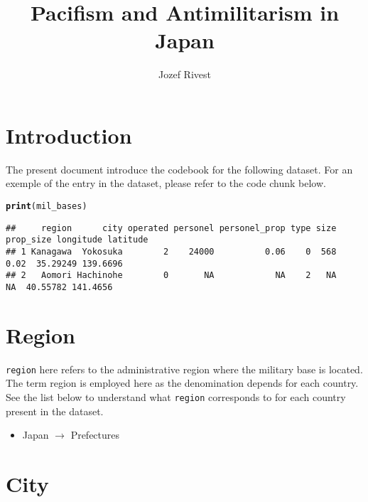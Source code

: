 \documentclass{article}\usepackage[]{graphicx}\usepackage[dvipsnames]{xcolor}
\title{Pacifism and Antimilitarism in Japan}
\author{Jozef Rivest}
\date{ }
\makeatletter
\newcommand{\hldef}[1]{\textcolor[rgb]{0.345,0.345,0.345}{#1}}%
\newcommand{\hlkwd}[1]{\textcolor[rgb]{0.737,0.353,0.396}{\textbf{#1}}}%
\newenvironment{kframe}{%
 \def\at@end@of@kframe{}%
 \ifinner\ifhmode%
  \def\at@end@of@kframe{\end{minipage}}%
  \begin{minipage}{\columnwidth}%
 \fi\fi%
 \def\FrameCommand##1{\hskip\@totalleftmargin \hskip-\fboxsep
 \colorbox{shadecolor}{##1}\hskip-\fboxsep
     \hskip-\linewidth \hskip-\@totalleftmargin \hskip\columnwidth}%
 \MakeFramed {\advance\hsize-\width
   \@totalleftmargin\z@ \linewidth\hsize
   \@setminipage}}%
 {\par\unskip\endMakeFramed%
 \at@end@of@kframe}
\newenvironment{knitrout}{}{} %
\makeatother
\begin{document}
\maketitle
\tableofcontents



\clearpage

\section{Introduction}

The present document introduce the codebook 
for the following dataset. For an exemple of 
the entry in the dataset, please refer to the 
code chunk below. 

\begin{knitrout}\footnotesize
{}\color{fgcolor}\begin{kframe}
\begin{alltt}
\hlkwd{print}\hldef{(mil_bases)}
\end{alltt}
\begin{verbatim}
##     region      city operated personel personel_prop type size prop_size longitude latitude
## 1 Kanagawa  Yokosuka        2    24000          0.06    0  568      0.02  35.29249 139.6696
## 2   Aomori Hachinohe        0       NA            NA    2   NA        NA  40.55782 141.4656
\end{verbatim}
\end{kframe}
\end{knitrout}


\section{Region}

\verb|region| here refers to the administrative region 
where the military base is located. The term region 
is employed here as the denomination depends for each 
country. See the list below to understand what \verb|region|
corresponds to for each country present in the dataset. 

\begin{itemize}
  \item Japan $\rightarrow$ Prefectures
\end{itemize}

\section{City}
\end{document}
